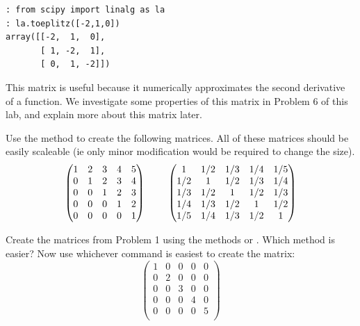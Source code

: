 \begin{lstlisting}[style=python]
: from scipy import linalg as la
: la.toeplitz([-2,1,0])
array([[-2,  1,  0],
       [ 1, -2,  1],
       [ 0,  1, -2]])
\end{lstlisting}

This matrix is useful because it numerically approximates the second derivative of a function. We investigate some properties of this matrix in Problem 6 of this lab, and explain more about this matrix later.

\begin{problem}
Use the  method to create the following matrices. All of these matrices should be easily scaleable (ie only minor modification would be required to change the size).
\[
\begin{pmatrix}
1&2&3&4&5\\
0&1&2&3&4\\
0&0&1&2&3 \\
0&0&0&1&2 \\
0&0&0&0&1 \\
\end{pmatrix}
\hspace{8mm}
\begin{pmatrix}
1&1/2&1/3 & 1/4 &1/5\\
1/2&1&1/2&1/3&1/4\\
1/3&1/2&1&1/2&1/3 \\
1/4&1/3&1/2&1&1/2 \\
1/5&1/4&1/3&1/2&1 \\
\end{pmatrix}
\]
\end{problem}

\begin{problem}
Create the matrices from Problem 1 using the methods  or . Which method is easier? Now use whichever command is easiest to create the matrix:
\[
\begin{pmatrix}
1&0&0&0&0\\
0&2&0&0&0\\
0&0&3&0&0 \\
0&0&0&4&0 \\
0&0&0&0&5 \\
\end{pmatrix}
\]
\end{problem}
 

